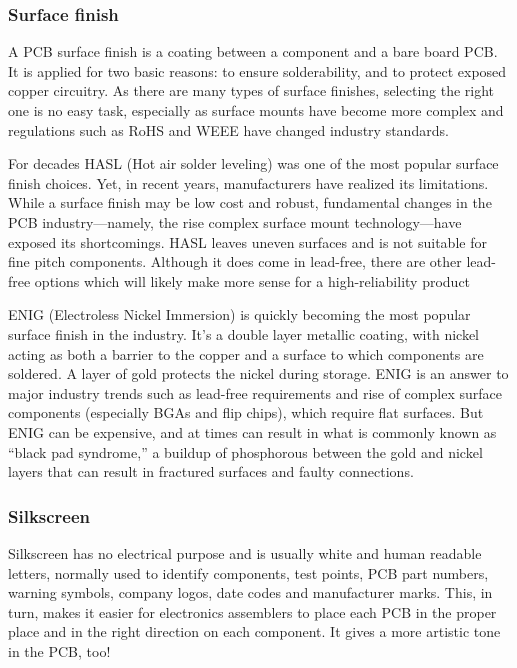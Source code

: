 \documentclass[final]{cubedoc}
\begin{document}
	\subsubsection{Surface finish}
	
	A PCB surface finish is a coating between a component and a bare board PCB. It is applied for two basic reasons: to ensure solderability, and to protect exposed copper circuitry. As there are many types of surface finishes, selecting the right one is no easy task, especially as surface mounts have become more complex and regulations such as RoHS and WEEE have changed industry standards.
	
	For decades HASL (Hot air solder leveling) was one of the most popular surface finish choices. Yet, in recent years, manufacturers have realized its limitations. While a surface finish may be low cost and robust, fundamental changes in the PCB industry—namely, the rise complex surface mount technology—have exposed its shortcomings. HASL leaves uneven surfaces and is not suitable for fine pitch components. Although it does come in lead-free, there are other lead-free options which will likely make more sense for a high-reliability product
	
	ENIG (Electroless Nickel Immersion) is quickly becoming the most popular surface finish in the industry. It’s a double layer metallic coating, with nickel acting as both a barrier to the copper and a surface to which components are soldered. A layer of gold protects the nickel during storage. ENIG is an answer to major industry trends such as lead-free requirements and rise of complex surface components (especially BGAs and flip chips), which require flat surfaces. But ENIG can be expensive, and at times can result in what is commonly known as “black pad syndrome,” a buildup of phosphorous between the gold and nickel layers that can result in fractured surfaces and faulty connections. 
	
	
	\subsubsection{Silkscreen}
	
	Silkscreen has no electrical purpose and is usually white and human readable letters, normally used to identify components, test points, PCB part numbers, warning symbols, company logos, date codes and manufacturer marks. This, in turn, makes it easier for electronics assemblers to place each PCB in the proper place and in the right direction on each component. It gives a more artistic tone in the PCB, too!
	
\end{document}
